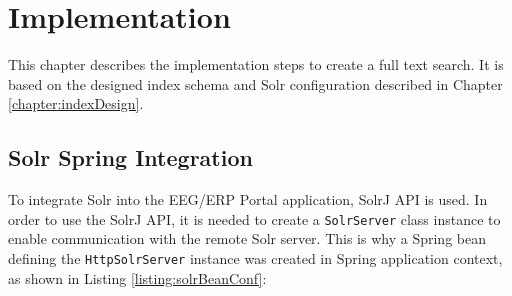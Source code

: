 \chapter{Implementation}
\label{chap:implementation}

This chapter describes the implementation steps to create a full text search. 
It is based on the designed index schema and Solr configuration described in Chapter \ref{chapter:indexDesign}.





%

\section{Solr Spring Integration}

To integrate Solr into the EEG/ERP Portal application, SolrJ API is used. 
In order to use the SolrJ API, it is needed to create a \texttt{SolrServer} class instance to enable communication with the remote Solr server. %
This is why a Spring bean defining the \texttt{HttpSolrServer} instance was created in Spring application context, as shown in Listing \ref{listing:solrBeanConf}:

